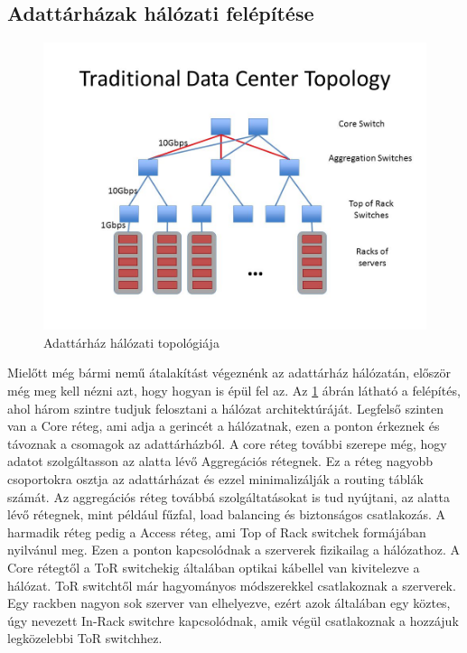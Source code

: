 \documentclass[12pt]{report}
\begin{document}
\subsection{Adattárházak hálózati felépítése}

\begin{figure}[h]
	\centering
	\includegraphics[width=0.7\linewidth]{pictures/Traditional+Data+Center+Topology.jpg}
	\caption{Adattárház hálózati topológiája}
	\label{datacenter_topology}
\end{figure}

Mielőtt még bármi nemű átalakítást végeznénk az adattárház hálózatán, először még meg kell nézni azt, hogy hogyan is épül fel az.
Az \ref{datacenter_topology} ábrán látható a felépítés, ahol három szintre tudjuk felosztani a hálózat architektúráját\cite{noauthor_you_nodate}\cite{noauthor_cisco_nodate}.
Legfelső szinten van a Core réteg, ami adja a gerincét a hálózatnak, ezen a ponton érkeznek és távoznak a csomagok az adattárházból.
A core réteg további szerepe még, hogy adatot szolgáltasson az alatta lévő Aggregációs rétegnek.
Ez a réteg nagyobb csoportokra osztja az adattárházat és ezzel minimalizálják a routing táblák számát.
Az aggregációs réteg továbbá szolgáltatásokat is tud nyújtani, az alatta lévő rétegnek, mint például fűzfal, load balancing és biztonságos csatlakozás.
A harmadik réteg pedig a Access réteg, ami Top of Rack switchek formájában nyilvánul meg.
Ezen a ponton kapcsolódnak a szerverek fizikailag a hálózathoz.
A Core rétegtől a ToR switchekig általában optikai kábellel van kivitelezve a hálózat. 
ToR switchtől már hagyományos módszerekkel csatlakoznak a szerverek.
Egy rackben nagyon sok szerver van elhelyezve, ezért azok általában egy köztes, úgy nevezett In-Rack switchre kapcsolódnak, amik végül csatlakoznak a hozzájuk legközelebbi ToR switchhez.
\end{document}
